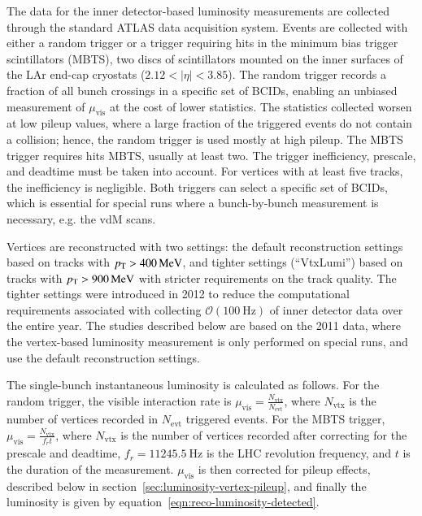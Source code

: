 The data for the inner detector-based luminosity measurements are collected through the standard ATLAS data acquisition system. Events are collected with either a random trigger or a trigger requiring hits in the minimum bias trigger scintillators (MBTS), two discs of scintillators mounted on the inner surfaces of the LAr end-cap cryostats ($2.12<|\eta|<3.85$). The random trigger records a fraction of all bunch crossings in a specific set of BCIDs, enabling an unbiased measurement of $\mu_{\mathrm{vis}}$ at the cost of lower statistics. The statistics collected worsen at low pileup values, where a large fraction of the triggered events do not contain a collision; hence, the random trigger is used mostly at high pileup. The MBTS trigger requires hits MBTS, usually at least two. The trigger inefficiency, prescale, and deadtime must be taken into account. For vertices with at least five tracks, the inefficiency is negligible. Both triggers can select a specific set of BCIDs, which is essential for special runs where a bunch-by-bunch measurement is necessary, e.g. the vdM scans. 

Vertices are reconstructed with two settings: the default reconstruction settings based on tracks with $p_{\text{T}}>\SI{400}{\mega\electronvolt}$, and tighter settings (``VtxLumi'') based on tracks with $p_{\text{T}}>\SI{900}{\mega\electronvolt}$ with stricter requirements on the track quality. The tighter settings were introduced in 2012 to reduce the computational requirements associated with collecting $\mathcal{O}(\SI{100}{\hertz})$ of inner detector data over the entire year. The studies described below are based on the 2011 data, where the vertex-based luminosity measurement is only performed on special runs, and use the default reconstruction settings.

The single-bunch instantaneous luminosity is calculated as follows. For the random trigger, the visible interaction rate is $\mu_{\mathrm{vis}}=\frac{N_{\mathrm{vtx}}}{N_{\mathrm{evt}}}$, where $N_{\mathrm{vtx}}$ is the number of vertices recorded in $N_{\mathrm{evt}}$ triggered events. For the MBTS trigger, $\mu_{\mathrm{vis}}=\frac{N_{\mathrm{vtx}}}{f_r t}$, where $N_{\mathrm{vtx}}$ is the number of vertices recorded after correcting for the prescale and deadtime, $f_r=\SI{11245.5}{\hertz}$ is the LHC revolution frequency, and $t$ is the duration of the measurement. $\mu_{\mathrm{vis}}$ is then corrected for pileup effects, described below in section~\ref{sec:luminosity-vertex-pileup}, and finally the luminosity is given by equation~\ref{eqn:reco-luminosity-detected}.


